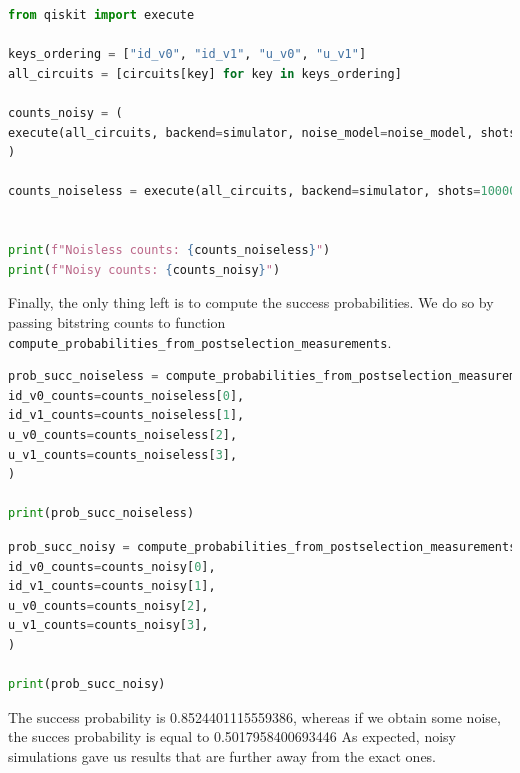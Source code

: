 \documentclass[preprint,12pt, a4paper, dvipsnames]{elsarticle}
\newcommand{\1}{{\rm 1\hspace{-0.9mm}l}}
\begin{document}
\begin{lstlisting}[language=Python, caption=Running  circuits]
from qiskit import execute

keys_ordering = ["id_v0", "id_v1", "u_v0", "u_v1"]
all_circuits = [circuits[key] for key in keys_ordering]

counts_noisy = (
execute(all_circuits, backend=simulator, noise_model=noise_model, shots=10000).result().get_counts()
)

counts_noiseless = execute(all_circuits, backend=simulator, shots=10000).result().get_counts()


print(f"Noisless counts: {counts_noiseless}")
print(f"Noisy counts: {counts_noisy}")
\end{lstlisting}


%



Finally, the only thing left is to compute the success probabilities. We do so by passing bitstring counts to function \\ \texttt{compute\_probabilities\_from\_postselection\_measurements}.


\begin{lstlisting}[language=Python, caption=Computation probability without noise]
prob_succ_noiseless = compute_probabilities_from_postselection_measurements(
id_v0_counts=counts_noiseless[0],
id_v1_counts=counts_noiseless[1],
u_v0_counts=counts_noiseless[2],
u_v1_counts=counts_noiseless[3],
)

print(prob_succ_noiseless)
\end{lstlisting}

\begin{lstlisting}[language=Python, caption=Computation probability including noise]
prob_succ_noisy = compute_probabilities_from_postselection_measurements(
id_v0_counts=counts_noisy[0],
id_v1_counts=counts_noisy[1],
u_v0_counts=counts_noisy[2],
u_v1_counts=counts_noisy[3],
)

print(prob_succ_noisy)
\end{lstlisting}
The success probability is 0.8524401115559386, whereas if we obtain some noise, the succes probability is equal to 0.5017958400693446
As expected, noisy simulations gave us results that are further away from the exact ones.
\end{document}

